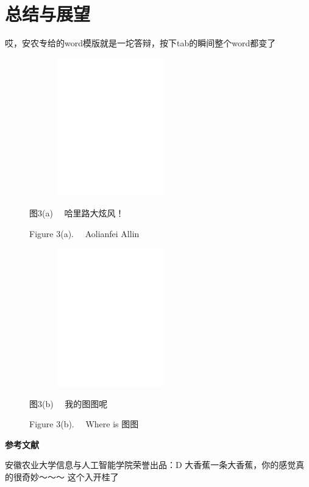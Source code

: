 \documentclass[UTF8,a4paper,12pt]{ctexart}
\begin{document}
	\section{总结与展望}
	哎，安农专给的word模版就是一坨答辩，按下tab的瞬间整个word都变了
	
	\begin{figure}[h]
		\vspace{-0.1cm} 
		\begin{minipage}[t]{0.45\linewidth}
			\centering
			\includegraphics[height=6cm,width=7cm]{pic/fknumscom-eps-converted-to.pdf}
			
			\begin{center}
				\fontsize{10.5pt}{\baselineskip}\heiti 图3(a) \ \  哈里路大炫风！ \par Figure 3(a). \ \ Aolianfei Allin
			\end{center} 
		\end{minipage}
		\begin{minipage}[t]{0.45\linewidth}
			\centering
			\includegraphics[height=6cm,width=7cm]{pic/fknumstime-eps-converted-to.pdf}
			
			\begin{center}
				\fontsize{10.5pt}{\baselineskip}\heiti 图3(b)  \ \  我的图图呢  \par Figure 3(b). \ \ Where is 图图
			\end{center} 
		\end{minipage}
	\end{figure}
	\newpage
	 
	\centerline{\textbf{\fontsize{16pt}{\baselineskip}\heiti 参考文献}}
	\small
	\vspace{-0.5cm} 
	\renewcommand{\refname}{\leftline{Reference}}
	\begin{thebibliography}{}
		\vspace{-1cm} 
		安徽农业大学信息与人工智能学院荣誉出品：D
		大香蕉一条大香蕉，你的感觉真的很奇妙～～～
		这个入开桂了
	\end{thebibliography}
\end{document}

